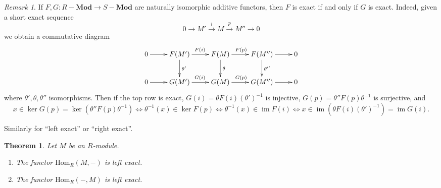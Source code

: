 \documentclass{amsart}[12pt]
\def\image{\operatorname{im}}
\def\im{\image}
\def\ker{\operatorname{ker}}
\newcommand{\Hom}{\mathrm{Hom}}
\numberwithin{equation}{section}
\theoremstyle{plain} %
\newtheorem{thm}[equation]{Theorem}
\theoremstyle{definition}
\theoremstyle{remark}
\newtheorem{rem}[equation]{Remark}
\newcommand{\xra}[1]{\xrightarrow{#1}}
\newcommand{\Mod}[1]{#1-\mathbf{Mod}}
\begin{document}
\begin{rem} If $F,G:\Mod{R} \to \Mod{S}$ are naturally isomorphic additive functors, then $F$ is exact if and only if $G$ is exact. Indeed, given a short exact sequence
\[ 0 \to M' \xra{i} M \xra{p} M'' \to 0\]
we obtain a commutative diagram
\[\xymatrix{
0 \ar[r] & F(M') \ar[r]^{F(i)} \ar[d]^-{\theta'} & F(M) \ar[r]^{F(p)} \ar[d]^-{\theta} & F(M'') \ar[r]\ar[d]^-{\theta''} & 0 \\
0 \ar[r] & G(M') \ar[r]^{G(i)}  & G(M) \ar[r]^{G(p)}  & G(M'') \ar[r] & 0 }\]
where $\theta',\theta,\theta''$ isomorphisms.
Then if the top row is exact, $G(i)=\theta F(i) (\theta')^{-1}$ is injective, $G(p)=\theta''  F(p) \theta^{-1}$ is surjective, and \[x\in \ker G(p) = \ker(\theta''  F(p) \theta^{-1}) \iff \theta^{-1} (x) \in \ker F(p) \iff \theta^{-1} (x) \in \im F(i) \iff x\in \im(\theta F(i) (\theta')^{-1}) = \im G(i).\]

Similarly for ``left exact'' or ``right exact''.
\end{rem}


\begin{thm} Let $M$ be an $R$-module.
\begin{enumerate}
\item The functor $\Hom_R(M,-)$ is left exact.
\item The functor $\Hom_R(-,M)$ is left exact.
\end{enumerate}
\end{thm}
\end{document}
